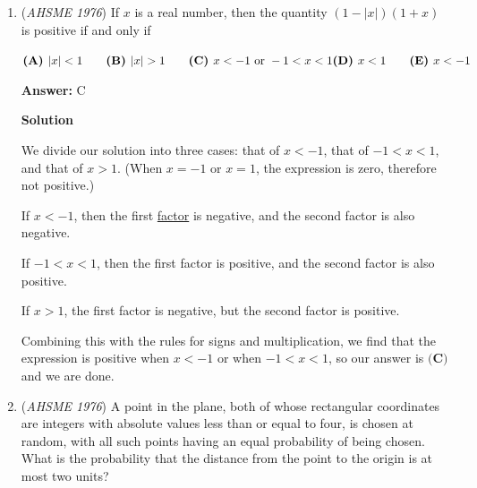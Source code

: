 \begin{enumerate}
 $\textbf{(A) }1,~2\qquad \textbf{(B) }-1,~-2\qquad \textbf{(C) }0,~3\qquad \textbf{(D) }0,~-3\qquad  \textbf{(E) }\frac{3}{2},~\frac{3}{2}$

 \textbf{Answer: }C



\textbf{Solution}

We let the roots of the first equation be $r,s$ and the roots of the second equation be $s, -t$. By Vieta's Formulas, $r+s=3$ and $s-t=-3$, $rs=c$ and $-st=c$. So, $r=t$. Thus, $t+s=3$, $s-t=3$, so $t=0$, and $s=3\Rightarrow \textbf{(C)}$.~MathJams

 


	\item (\textit{AHSME 1976}) If $x$ is a real number, then the quantity $(1-|x|)(1+x)$ is positive if and only if


 $\textbf{(A) }|x|<1\qquad \textbf{(B) }|x|>1\qquad \textbf{(C) }x<-1\text{ or }-1<x<1\qquad\\ \textbf{(D) }x<1\qquad  \textbf{(E) }x<-1$

 \textbf{Answer: }C



\textbf{Solution}

We divide our solution into three cases: that of $x < -1$, that of $-1 < x < 1$, and that of $x > 1$. (When $x = -1$ or $x = 1$, the expression is zero, therefore not positive.)

 If $x < -1$, then the first \href{https://artofproblemsolving.com/wiki/index.php?title=Factor}{factor} is negative, and the second factor is also negative.

 If $-1 < x < 1$, then the first factor is positive, and the second factor is also positive.

 If $x > 1$, the first factor is negative, but the second factor is positive.

 Combining this with the rules for signs and multiplication, we find that the expression is positive when $x < -1$ or when $-1 < x < 1$, so our answer is $\boxed{\textbf{(C)}}$ and we are done.

 


	\item (\textit{AHSME 1976}) A point in the plane, both of whose rectangular coordinates are integers with absolute values less than or equal to four, 
is chosen at random, with all such points having an equal probability of being chosen. What is the probability that the distance 
from the point to the origin is at most two units?



\end{enumerate}
